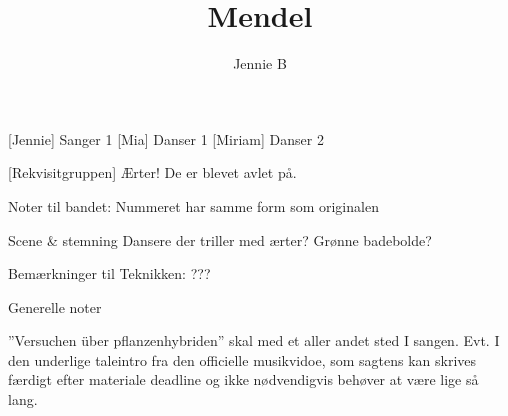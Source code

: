 \documentclass[a4paper,11pt]{article}
\title{Mendel}
\author{Jennie B}
\begin{document}
\maketitle

\begin{roles}
    [Jennie] Sanger 1
    [Mia] Danser 1
    [Miriam] Danser 2
\end{roles}

\begin{props}
    [Rekvisitgruppen] Ærter! De er blevet avlet på.
\end{props}

\scene
Noter til bandet:
Nummeret har samme form som originalen

Scene \& stemning
Dansere der triller med ærter? Grønne badebolde?

Bemærkninger til Teknikken:
???

Generelle noter

”Versuchen über pflanzenhybriden” skal med et aller andet sted I sangen. Evt. I den underlige taleintro fra den officielle musikvidoe, som sagtens kan skrives færdigt efter materiale deadline og ikke nødvendigvis behøver at være lige så lang.
\end{document}
